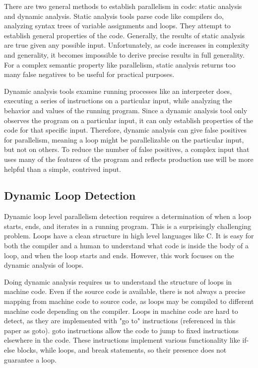 \documentclass[12pt,twoside]{reedthesis}
\begin{document}
			There are two general methods to establish parallelism in code: static analysis and dynamic analysis. Static analysis tools parse code like compilers do, analyzing syntax trees of variable assignments and loops. They attempt to establish general properties of the code. Generally, the results of static analysis are true given any possible input. Unfortunately, as code increases in complexity and generality, it becomes impossible to derive precise results in full generality. 
			For a complex semantic property like parallelism, static analysis returns too many false negatives to be useful for practical purposes. 
			
			Dynamic analysis tools examine running processes like an interpreter does, executing a series of instructions on a particular input, while analyzing the behavior and values of the running program. Since a dynamic analysis tool only observes the program on a particular input, it can only establish properties of the code for that specific input. Therefore, dynamic analysis can give false positives for parallelism, meaning a loop might be parallelizable on the particular input, but not on others. To reduce the number of false positives, a complex input that uses many of the features of the program and reflects production use will be more helpful than a simple, contrived input. 
			
		\subsection{Dynamic Loop Detection}\label{s:loopprof-detection}
		
		Dynamic loop level parallelism detection requires a determination of when a loop starts, ends, and iterates in a running program.
		This is a surprisingly challenging problem. 
		Loops have a clean structure in high level languages like C. It is easy for both the compiler and a human to understand what code is inside the body of a loop, and when the loop starts and ends. However, this work focuses on the dynamic analysis of loops. 
		
		Doing dynamic analysis requires us to understand the structure of loops in machine code. Even if the source code is available, there is not always a precise mapping from machine code to source code, as loops may be compiled to different machine code depending on the compiler. Loops in machine code are hard to detect, as they are implemented with "go to" instructions (referenced in this paper as goto). goto instructions allow the code to jump to fixed instructions elsewhere in the code. These instructions implement various functionality like if-else blocks, while loops, and break statements, so their presence does not guarantee a loop.
		
\end{document}
